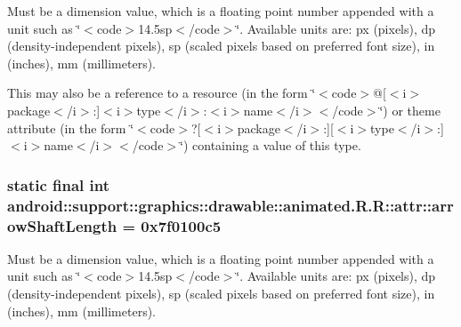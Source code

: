 Must be a dimension value, which is a floating point number appended with a unit such as \char`\"{}$<$code$>$14.5sp$<$/code$>$\char`\"{}. Available units are: px (pixels), dp (density-independent pixels), sp (scaled pixels based on preferred font size), in (inches), mm (millimeters). 

This may also be a reference to a resource (in the form \char`\"{}$<$code$>$@\mbox{[}$<$i$>$package$<$/i$>$:\mbox{]}$<$i$>$type$<$/i$>$:$<$i$>$name$<$/i$>$$<$/code$>$\char`\"{}) or theme attribute (in the form \char`\"{}$<$code$>$?\mbox{[}$<$i$>$package$<$/i$>$:\mbox{]}\mbox{[}$<$i$>$type$<$/i$>$:\mbox{]}$<$i$>$name$<$/i$>$$<$/code$>$\char`\"{}) containing a value of this type. \hypertarget{classandroid_1_1support_1_1graphics_1_1drawable_1_1animated_1_1_r_1_1attr_cc1a11732ae6e22cce8e95874c44a78c}{
\subsubsection[{arrowShaftLength}]{\setlength{\rightskip}{0pt plus 5cm}static final int android::support::graphics::drawable::animated.R.R::attr::arrowShaftLength = 0x7f0100c5}}
\label{classandroid_1_1support_1_1graphics_1_1drawable_1_1animated_1_1_r_1_1attr_cc1a11732ae6e22cce8e95874c44a78c}


Must be a dimension value, which is a floating point number appended with a unit such as \char`\"{}$<$code$>$14.5sp$<$/code$>$\char`\"{}. Available units are: px (pixels), dp (density-independent pixels), sp (scaled pixels based on preferred font size), in (inches), mm (millimeters). 

